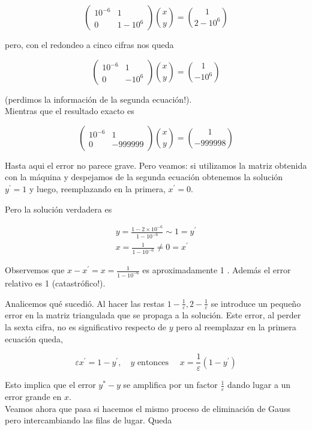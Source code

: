 \documentclass[10pt]{article}
\begin{document}
$$
\left(\begin{array}{cc}
10^{-6} & 1 \\
0 & 1-10^{6}
\end{array}\right)\binom{x}{y}=\binom{1}{2-10^{6}}
$$

pero, con el redondeo a cinco cifras nos queda

$$
\left(\begin{array}{cc}
10^{-6} & 1 \\
0 & -10^{6}
\end{array}\right)\binom{x}{y}=\binom{1}{-10^{6}}
$$

(perdimos la información de la segunda ecuación!).\\
Mientras que el resultado exacto es

$$
\left(\begin{array}{cc}
10^{-6} & 1 \\
0 & -999999
\end{array}\right)\binom{x}{y}=\binom{1}{-999998}
$$

Hasta aqui el error no parece grave. Pero veamos: si utilizamos la matriz obtenida con la máquina y despejamos de la segunda ecuación obtenemos la solución $y^{\prime}=1$ y luego, reemplazando en la primera, $x^{\prime}=0$.

Pero la solución verdadera es

$$
\begin{gathered}
y=\frac{1-2 \times 10^{-6}}{1-10^{-6}} \sim 1=y^{\prime} \\
x=\frac{1}{1-10^{-6}} \neq 0=x^{\prime}
\end{gathered}
$$

Observemos que $x-x^{\prime}=x=\frac{1}{1-10^{-6}}$ es aproximadamente 1 . Además el error relativo es 1 (catastrófico!).

Analicemos qué sucedió. Al hacer las restas $1-\frac{1}{\varepsilon}, 2-\frac{1}{\varepsilon}$ se introduce un pequeño error en la matriz triangulada que se propaga a la solución. Este error, al perder la sexta cifra, no es significativo respecto de $y$ pero al reemplazar en la primera ecuación queda,

$$
\varepsilon x^{\prime}=1-y^{\prime}, \quad y \text { entonces } \quad x=\frac{1}{\varepsilon}\left(1-y^{\prime}\right)
$$

Esto implica que el error $y^{*}-y$ se amplifica por un factor $\frac{1}{\varepsilon}$ dando lugar a un error grande en $x$.\\
Veamos ahora que pasa si hacemos el mismo proceso de eliminación de Gauss pero intercambiando las filas de lugar. Queda
\end{document}
